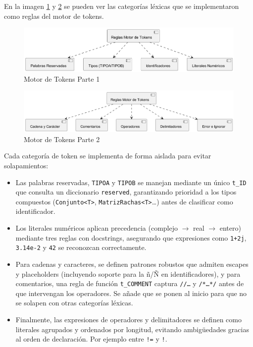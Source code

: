 \documentclass{article}
\begin{document}
\vspace{1em}

En la imagen \ref{fig:MotorTokens1} y \ref{fig:MotorTokens2}
 se pueden ver las categorías léxicas que se implementaron como
reglas del motor de tokens.

\begin{figure}[ht]
  \centering
  \includegraphics[width=1\textwidth]{MotorTokens1.png}
  \caption{Motor de Tokens Parte 1}
  \label{fig:MotorTokens1}
\end{figure}

\begin{figure}[ht]
  \centering
  \includegraphics[width=1\textwidth]{MotorTokens2.png}
  \caption{Motor de Tokens Parte 2}
  \label{fig:MotorTokens2}
\end{figure}


\noindent Cada categoría de token se implementa de forma aislada para evitar 
solapamientos:
\begin{itemize}
  \item Las palabras reservadas, \texttt{TIPOA} y \texttt{TIPOB}
      se manejan mediante un único \texttt{t\_ID} que consulta un diccionario 
      \texttt{reserved}, garantizando prioridad a los tipos compuestos 
      (\texttt{Conjunto<T>}, \texttt{MatrizRachas<T>}\dots) antes de clasificar 
      como identificador.
  \item Los literales numéricos aplican precedencia 
      (complejo \(\rightarrow\) real \(\rightarrow\) entero) mediante tres reglas 
        con docstrings, asegurando que expresiones 
        como \texttt{1+2j}, \texttt{3.14e-2} y \texttt{42} se reconozcan correctamente.
  \item Para cadenas y caracteres, se definen patrones robustos 
    que admiten escapes y placeholders (incluyendo soporte para la ñ/Ñ 
    en identificadores), y para comentarios, una regla de función 
    \texttt{t\_COMMENT} captura \texttt{//…} y \texttt{/*…*/} antes de que 
    intervengan los operadores. Se añade que se ponen al inicio para que no 
    se solapen con otras categorías léxicas.
  \item Finalmente, las expresiones de operadores y delimitadores se 
    definen como literales agrupados y ordenados por longitud, 
    evitando ambigüedades gracias al orden de declaración. Por
    ejemplo entre \texttt{!=} y \texttt{!}.
\end{itemize}
\end{document}
